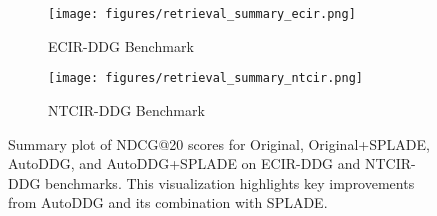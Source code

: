 \begin{figure}
	\centering
	\begin{subfigure}{0.49\columnwidth} 
		\centering
		\texttt{[image: figures/retrieval\_summary\_ecir.png]}
		\caption{ECIR-DDG Benchmark}
        \label{fig:ablation_noSTA}
	\end{subfigure}
        \begin{subfigure}{0.49\columnwidth} 
		\centering
		\texttt{[image: figures/retrieval\_summary\_ntcir.png]}
		\caption{NTCIR-DDG Benchmark}
        \label{fig:ablation_ufd}
	\end{subfigure}
    \vspace{-1.0em}
	\caption{Summary plot of NDCG@20 scores for Original, Original+SPLADE, AutoDDG, and AutoDDG+SPLADE on ECIR-DDG and NTCIR-DDG benchmarks. This visualization highlights key improvements from AutoDDG and its combination with SPLADE.}
	\label{fig:summary_retrieval}
    \vspace{-.4cm}
\end{figure}


